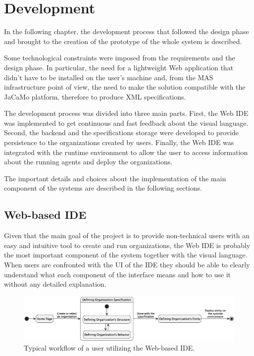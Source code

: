 \chapter{Development}\label{development}

In the following chapter, the development process that followed the design phase and brought to the creation of the prototype of the whole system is described.

Some technological constraints were imposed from the requirements and the design phase.
In particular, the need for a lightweight Web application that didn't have to be installed on the user's machine and, from the MAS infrastructure point of view, the need to make the solution compatible with the JaCaMo platform, therefore to produce XML \moise{} specifications.

The development process was divided into three main parts.
First, the Web IDE was implemented to get continuous and fast feedback about the visual language.
Second, the backend and the specifications storage were developed to provide persistence to the organizations created by users.
Finally, the Web IDE was integrated with the runtime environment to allow the user to access information about the running agents and deploy the organizations.

The important details and choices about the implementation of the main component of the systems are described in the following sections.

\section{Web-based IDE}
Given that the main goal of the project is to provide non-technical users with an easy and intuitive tool to create and run organizations, the Web IDE is probably the most important component of the system together with the visual language.
When users are confronted with the UI of the IDE they should be able to clearly understand what each component of the interface means and how to use it without any detailed explanation.

\begin{figure}
    \centering
    \includegraphics[width=\linewidth]{images/web-ide.eps}
    \caption{Typical workflow of a user utilizing the Web-based IDE.}
    \label{fig:ide}
\end{figure}

